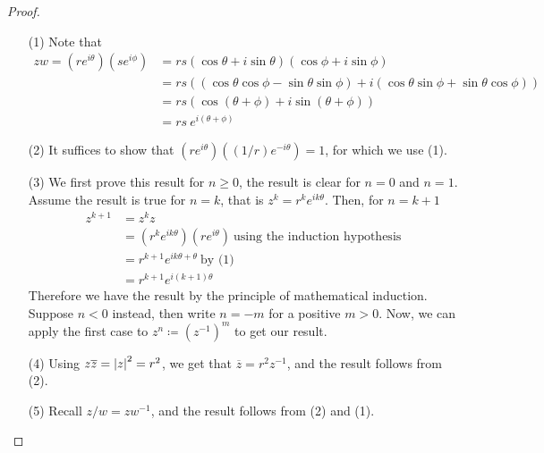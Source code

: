 \begin{proof}\hfill
\begin{itemize}
\item[(1)] Note that
\begin{align*}
zw = (re^{i\theta})(se^{i\phi})&= rs(\cos\theta + i\sin\theta)(\cos\phi + i\sin\phi)\\[0.5em]
&= rs((\cos\theta\cos\phi - \sin\theta\sin\phi) + i(\cos\theta\sin\phi + \sin\theta\cos\phi))\\[0.5em]
&= rs(\cos(\theta + \phi) + i\sin(\theta + \phi))\\[0.5em]
&= rs\  e^{i(\theta + \phi)}
\end{align*}
\item[(2)] It suffices to show that $(re^{i\theta})((1/r) e^{-i\theta}) = 1$, for which we use (1).
\item[(3)] We first prove this result for $n \geq 0$, the result is clear for $n = 0$ and $n = 1$. Assume the result is true for $n = k$, that is $z^k = r^k e^{ik\theta}$. Then, for $n = k+1$
\begin{align*}
z^{k+1} &= z^kz\\[0.5em]
&= (r^k e^{ik\theta})(re^{i\theta})\ \text{using the induction hypothesis}\\[0.5em]
&= r^{k+1} e^{ik\theta+\theta}\ \text{by (1)}\\[0.5em]
&= r^{k+1} e^{i(k+1)\theta}
\end{align*}
Therefore we have the result by the principle of mathematical induction.\\[0.5em]
Suppose $n<0$ instead, then write $n = -m$ for a positive $m>0$. Now, we can apply the first case to $z^n \coloneqq (z^{-1})^m$ to get our result.
\item[(4)] Using $z\overline{z} = \left\lvert z\right\rvert^2 = r^2$, we get that $\overline{z} = r^2z^{-1}$, and the result follows from (2).
\item[(5)] Recall $z/w = zw^{-1}$, and the result follows from (2) and (1).
\end{itemize}
\vspace*{-\baselineskip}
\end{proof}

\medskip

